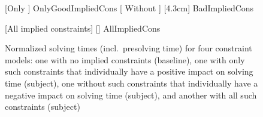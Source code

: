 \begin{figure}
  \centering%

                      [Only ]
                      {OnlyGoodImpliedCons}%
  \hfill%
                      [%
                        Without
                      ]%
                      [4.3cm]%
                      {BadImpliedCons}%

  \vspace{\betweensubfigures}

                      [All implied constraints]%
                      [\linewidth]%
                      {AllImpliedCons}%

  \caption[%
            Plot for evaluating the impact on solving time made by different
            combinations of implied constraints%
          ]%
          {%
            Normalized solving times (incl.\ presolving time) for four
            constraint models: one with no implied constraints (baseline), one
            with only such constraints that individually have a positive impact
            on solving time (subject), one without such constraints that
            individually have a negative impact on solving time (subject), and
            another with all such constraints (subject)%
          }
\end{figure}

